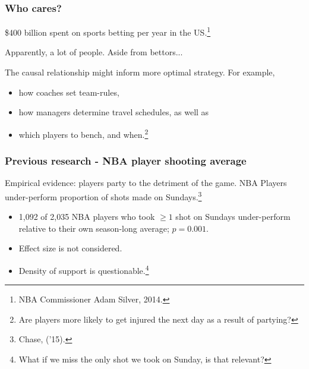 \documentclass{beamer}
\begin{document}



\begin{frame}   
  \frametitle{Who cares?}
  \begin{block}{\$400 billion spent on sports betting per year in the US.\footnote{NBA Commissioner Adam Silver, 2014.}}

    Apparently, a lot of people. Aside from bettors...
  \end{block}

  \vspace{12pt}\begin{block}{The causal relationship might inform more optimal strategy.}     For example,
    \begin{itemize}       
      \item how coaches set team-rules, 
      \item how managers determine travel schedules, as well as
      \item which players to bench, and when.\footnote{Are players more likely to get injured the next day as a result of partying?}
    \end{itemize}
  \end{block}
\end{frame}

\begin{frame}
  \frametitle{Previous research - NBA player shooting average}
  \begin{block}{Empirical evidence: players party to the detriment of the game.}
  NBA Players under-perform proportion of shots made on Sundays.\footnote{Chase, ('15).}
  \end{block}
    \begin{itemize}       
    \item 1,092 of 2,035 NBA players who took $\geq 1$ shot on Sundays under-perform 
      relative to their own season-long average; $p=0.001$.
      \item Effect size is not considered.
      \item Density of support is questionable.\footnote{What if we miss the only shot we took on Sunday, is that relevant?}     \end{itemize}
\end{frame}
\end{document}

